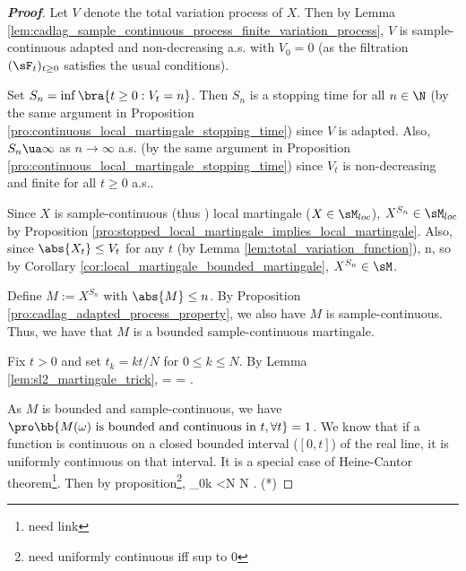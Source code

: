 \begin{proof}[\bf Proof]
Let $V$ denote the total variation process of $X$. Then by Lemma \ref{lem:cadlag_sample_continuous_process_finite_variation_process}, $V$ is sample-continuous adapted and non-decreasing a.s. with $V_0 = 0$ (as the filtration $(\sF_t)_{t\geq 0}$ satisfies the usual conditions).

Set $S_n = \inf\bra{t \geq 0 : V_t = n}$. Then $S_n$ is a stopping time for all $n \in \N$ (by the same argument in Proposition \ref{pro:continuous_local_martingale_stopping_time}) since $V$ is adapted. Also, $S_n \ua \infty$ as $n \to \infty$ a.s. (by the same argument in Proposition \ref{pro:continuous_local_martingale_stopping_time}) since $V_t$ is non-decreasing and finite for all $t \geq 0$ a.s..

Since $X$ is sample-continuous (thus \cadlag) local martingale ($X\in \sM_{loc}$), $X^{S_n} \in \sM_{loc}$ by Proposition \ref{pro:stopped_local_martingale_implies_local_martingale}. Also, since $\abs{X_t} \leq V_t$ for any $t$ (by Lemma \ref{lem:total_variation_function}),
\be
{} \leq {} \leq n,
\ee
so by Corollary \ref{cor:local_martingale_bounded_martingale}, $X^{S_n} \in \sM$.

Define $M := X^{S_n}$ with $\abs{M}\leq n$. By Proposition \ref{pro:cadlag_adapted_process_property}, we also have $M$ is sample-continuous. Thus, we have that $M$ is a bounded sample-continuous martingale.


Fix $t > 0$ and set $t_k = kt/N$ for $0 \leq k \leq N$. By Lemma \ref{lem:sl2_martingale_trick},
\be
\E{} = \E{} = \E{} \leq  \E{}.\nonumber
\ee

As $M$ is bounded and sample-continuous, we have $\pro\bb{M(\omega) \text{ is bounded and continuous in }t, \forall t} = 1$. We know that if a function is continuous on a closed bounded interval ($[0,t]$) of the real line, it is uniformly continuous on that interval. It is a special case of Heine-Cantor theorem\footnote{need link}. Then by proposition\footnote{need uniformly continuous iff sup to 0},
\be
\sup_{0\leq k <N}   \quad {}N \to \infty. \quad\quad (*)
\ee



\end{proof}
